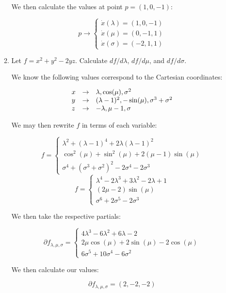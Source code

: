\begin{enumerate}
\begin{enumerate}
          We then calculate the values at point $p=(1,0,-1)$:

          $$p\to\left\{\begin{array}{l} \dot{x}(\lambda)=(1,0,-1)\\\dot{x}(\mu)=(0,-1,1)\\\dot{x}(\sigma)=(-2,1,1)\end{array}$$

      \item Let $f=x^2+y^2-2yz$. Calculate $df/d\lambda$, $df/d\mu$, and $df/d\sigma$.

        We know the following values correspond to the Cartesian coordinates:

        $$\begin{array}{l l l} x & \to & \lambda, \cos(\mu), \sigma^2\\ y & \to & (\lambda-1)^2,-\sin(\mu),\sigma^3+\sigma^2\\ z & \to & -\lambda,\mu-1,\sigma \end{array}$$

        We may then rewrite $f$ in terms of each variable:

        $$f=\left\{\begin{array}{l} \lambda^2+(\lambda-1)^4+2\lambda(\lambda-1)^2\\ \cos^2(\mu)+\sin^2(\mu)+2(\mu-1)\sin(\mu)\\\sigma^4+(\sigma^3+\sigma^2)^2-2\sigma^4-2\sigma^3\end{array}$$
        $$f=\left\{\begin{array}{l} \lambda^4-2\lambda^3+3\lambda^2-2\lambda+1\\ (2\mu-2)\sin(\mu)\\\sigma^6+2\sigma^5-2\sigma^3\end{array}$$

          We then take the respective partials:

          $$\partial f_{\lambda,\mu,\sigma}=\left\{\begin{array}{l} 4\lambda^3-6\lambda^2+6\lambda-2\\ 2\mu\cos(\mu)+2\sin(\mu)-2\cos(\mu)\\6\sigma^5+10\sigma^4-6\sigma^2\end{array}$$

          We then calculate our values:

          $$\boxed{\partial f_{\lambda,\mu,\sigma}=(2,-2,-2)}$$

    \end{enumerate}


\end{enumerate}
